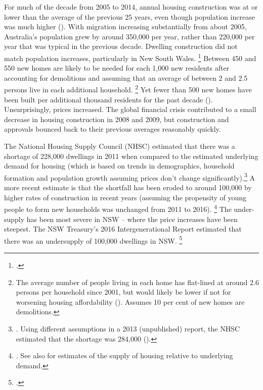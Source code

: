 For much of the decade from 2005 to 2014, annual housing construction was at or lower than the average of the previous 25 years, even though population increase was much higher ().
With migration increasing substantially from about 2005, Australia's population grew by around 350,000 per year, rather than 220,000 per year that was typical in the previous decade.
Dwelling construction did not match population increases, particularly in New South Wales.%
  \footcites{KohlerandvanderMerwe}[][57]{NSWBudget2016}
Between 450 and 550 new homes are likely to be needed for each 1,000 new residents after accounting for demolitions and assuming that an average of between 2 and 2.5 persons live in each additional household.%
    \footnote{The average number of people living in each home has flat-lined at around 2.6 persons per household since 2001, but would likely be lower if not for worsening housing affordability (\textcite{Daley-Coates-2017-Ben-phillips}). Assumes 10 per cent of new homes are demolitions.}
Yet fewer than 500 new homes have been built per additional thousand residents for the past decade (). Unsurprisingly, prices increased.
The global financial crisis contributed to a small decrease in housing construction in 2008 and 2009, but construction and approvals bounced back to their previous averages reasonably quickly.

The National Housing Supply Council (NHSC) estimated that there was a shortage of 228,000 dwellings in 2011 when compared to the estimated underlying demand for housing (which is based on trends in demographics, household formation and population growth  assuming prices don't change significantly).\footnote{\textcites{Treasury2012SupplyAfford}{Kearns2012dwellings}.
Using different assumptions in a 2013 (unpublished) report, the NHSC estimated that the shortage was 284,000 (\textcite{Treasury2013SupplyAffordchanges}).} A more recent estimate is that the shortfall has been eroded to around 100,000 by higher rates of construction in recent years (assuming the propensity of young people to form new households was unchanged from 2011 to 2016).%
    \footnote{\textcite{Gradwell2017HousingBalance}. See also \textcites{KohlerandvanderMerwe}{OngEtAl-AHURI-2017-Housing-supply-responsiveness} for estimates of the supply of housing relative to underlying demand.}
The under-supply has been most severe in NSW -- where the price increases have been steepest.
The NSW Treasury's 2016 Intergenerational Report estimated that there was an undersupply of 100,000 dwellings in NSW.%
\footcite[][57]{NSWBudget2016}

